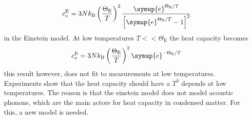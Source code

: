 \begin{equation*}
    c_v ^{\text{E}} = 3 N k_\text{B} \left ( \frac{\Theta_\text{E}}{T} \right )^2 \frac{ \symup{e}^{\Theta_\text{E}/T}}{\left [ \symup{e}^{\Theta_\text{E}/T} - 1 \right ]^2}
    \label{eq:heat_einstein}
\end{equation*}
in the Einstein model.
At low temperatures $T<<\Theta_\text{E}$ the heat capacity becomes 
\begin{equation*}
    c_v ^{\text{E}} = 3Nk_\text{B} \left ( \frac{\Theta_\text{E}}{T} \right )^2 \symup{e}^{-\Theta_\text{E}/T}
\end{equation*}
this result however, does not fit to measurements at low temperatures.
Experiments show that the heat capacity should have a $T^3$ depends at low temperatures.
The reason is that the einstein model does not model acoustic phonons, which are the main actors for heat capacity in condensed matter.
For this, a new model is needed.
